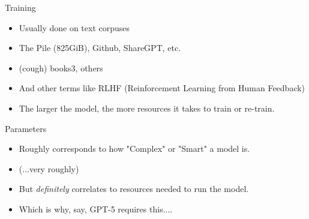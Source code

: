 \documentclass{beamer}
\begin{document}
\begin{frame}{Training}
	\begin{itemize}
		\item Usually done on text corpuses
		\pause
		\item The Pile (825GiB), Github, ShareGPT, etc.
		\pause
		\item (cough) books3, others
		\pause
		\item And other terms like RLHF (Reinforcement Learning from Human Feedback)
		\pause
		\item The larger the model, the more resources it takes to train or re-train.
	\end{itemize}
\end{frame}

\begin{frame}{Parameters}
	\begin{itemize}
		\item Roughly corresponds to how "Complex" or "Smart" a model is.
		\pause
		\item (...very roughly)
		\pause 
		\item But \textit{definitely} correlates to resources needed to run the model.
		\pause
		\item Which is why, say, GPT-5 requires this....
	\end{itemize}
\end{frame}



\begin{frame}[plain]
\end{frame}
\end{document}
